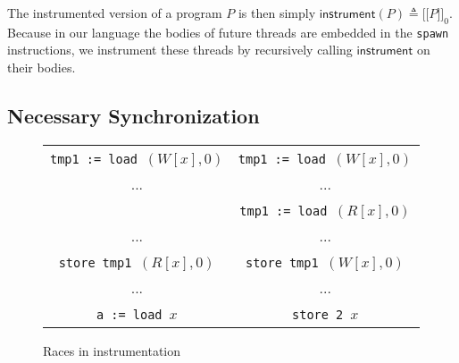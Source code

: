 \documentclass[preprint, 10pt]{sigplanconf}
\newcommand{\meanl}{\ensuremath{[ \! [}}
\newcommand{\meanr}{\ensuremath{] \! ]}}
\newcommand{\means}[1]{\ensuremath{\meanl #1 \meanr}}
\newcommand{\load}[2]{#1\ \texttt{:= load}\ #2}
\newcommand{\store}[2]{\texttt{store}\ #2\ #1}
\newcommand{\instr}[2]{\ensuremath{\means{#2}_{#1}}}
\newcommand{\instrp}[1]{\ensuremath{\mathsf{instrument}(#1)}}
\begin{document}
The instrumented version of a program $P$ is then simply $\instrp{P} \triangleq \instr{0}{P}$. Because in our language the bodies of future threads are embedded in the \texttt{spawn} instructions, we instrument these threads by recursively calling $\mathsf{instrument}$ on their bodies.

\subsection{Necessary Synchronization}
\label{sync}

\begin{figure}[htb]
\centering
\begin{tabular}{c || c}
\load{\texttt{tmp1}}{$(W[x], 0)$} & \load{\texttt{tmp1}}{$(W[x], 0)$}\\
... & ...\\
& \load{\texttt{tmp1}}{$(R[x], 0)$}\\
... & ...\\
\store{$(R[x], 0)$}{\texttt{tmp1}} & \store{$(W[x], 0)$}{\texttt{tmp1}}\\
... & ...\\
\load{\texttt{a}}{$x$} & \store{$x$}{\texttt{2}}
\end{tabular}

\caption{Races in instrumentation}
\label{instr-race}
\end{figure}
\end{document}
